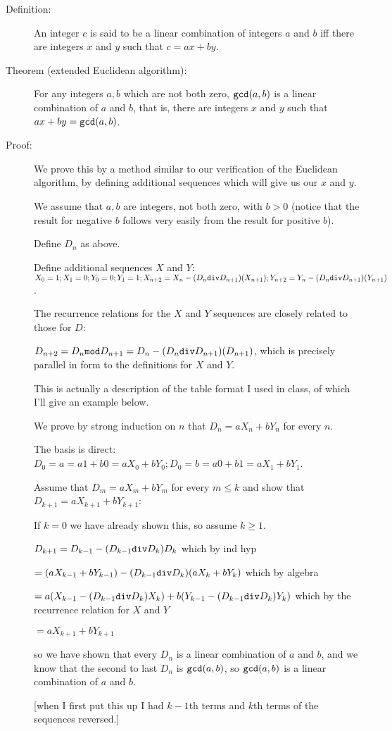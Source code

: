 \documentclass[12pt]{article}
\begin{document}
\begin{description}

\item[Definition:]  An integer $c$ is said to be a linear combination of integers $a$ and $b$ iff there are integers
$x$ and $y$ such that $c=ax+by$.

\item[Theorem (extended Euclidean algorithm):]   For any integers $a,b$ which are not both zero, 
${\tt gcd}(a,b)$ is a linear combination of $a$ and $b$, that is, there are integers $x$ and $y$ such that
$ax+by = {\tt gcd}(a,b)$.

\item[Proof:]  We prove this by a method similar to our verification of the Euclidean algorithm, by defining additional sequences which will give us our $x$ and $y$.

We assume that $a,b$ are integers, not both zero, with $b>0$ (notice that the result for negative $b$ follows
very easily from the result for positive $b$).

Define $D_n$ as above.

Define additional sequences $X$ and $Y$:  $X_0 = 1; X_1 = 0; Y_0 = 0; Y_1 = 1; X_{n+2} = X_{n} - (D_n{\tt div}D_{n+1})(X_{n+1}); Y_{n+2} = Y_{n} - (D_n{\tt div}D_{n+1})(Y_{n+1})$.

The recurrence relations for the $X$ and $Y$ sequences are closely related to those for $D$:

$D_{n+2} = D_n{\tt mod}D_{n+1} = D_n - (D_n{\tt div}D_{n+1})(D_{n+1})$, which is precisely parallel in form to the definitions for $X$ and $Y$.

This is actually a description of the table format I used in class, of which I'll give an example below.

We prove by strong induction on $n$ that $D_n = aX_n + bY_n$ for every $n$.

The basis is direct:  $D_0 = a = a1 +b0 = aX_0 + bY_0;  D_0 = b = a0 +b1 = aX_1 + bY_1$.

Assume that $D_m = aX_m + bY_m$ for every $m \leq k$ and show that $D_{k+1} = aX_{k+1} + bY_{k+1}$:

If $k=0$ we have already shown this, so assume $k \geq 1$.

$D_{k+1} = D_{k-1} - (D_{k-1} {\tt div}D_{k})D_{k}$ which by ind hyp

$= (aX_{k-1} + bY_{k-1}) - (D_{k-1} {\tt div}D_{k})(aX_{k}+bY_{k})$ which by algebra

$= a(X_{k-1} - (D_{k-1}{\tt div}D_{k})X_{k}) + b(Y_{k-1} - (D_{k-1} {\tt div}D_{k})Y_{k})$ which by the recurrence relation for $X$ and $Y$

$=aX_{k+1}+bY_{k+1}$

so we have shown that every $D_n$ is a linear combination of $a$ and $b$, and we know that the second to last $D_n$ is ${\tt gcd}(a,b)$, so ${\tt gcd}(a,b)$ is a linear combination of $a$ and $b$.

[when I first put this up I had $k-1$th terms and $k$th terms of the sequences reversed.]


\end{description}
\end{document}
